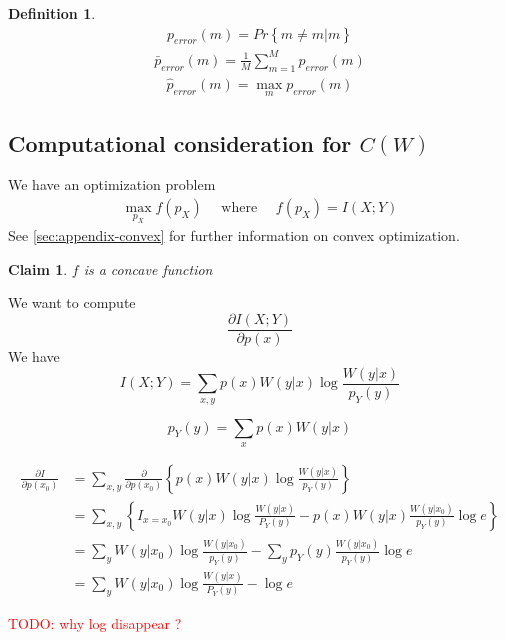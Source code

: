 \documentclass{article}
\newtheorem{claim}{Claim}[section]
\newtheorem{definition}{Definition}[section]
\theoremstyle{definition} %
\newcommand{\todo}[1]{\textcolor{red}{TODO: #1}}
\renewcommand{\Pr}[1]{Pr\left\{#1\right\}}
\begin{document}
\begin{definition}
  \begin{align*}
    p_{error}(m) = \Pr{\hat{m} \neq m | m}
  \end{align*}
  \begin{align*}
    \bar{p}_{error}(m) = \frac{1}{M} \sum_{m=1}^M p_{error}(m)
  \end{align*}
  \begin{align*}
    \hat{p}_{error}(m) = \max_{m} p_{error}(m)
  \end{align*}
\end{definition}



\subsection{Computational consideration for $C(W)$}
We have an optimization problem
  \begin{align*}
    \max_{p_X} f(p_X) \quad \text{ where } \quad f(p_X) = I(X ; Y)
  \end{align*}
See \cref{sec:appendix-convex} for further information on convex optimization.
  \begin{claim}
    $f$ is a concave function
  \end{claim}






We want to compute
\[
  \frac {\partial  I(X;Y)} {\partial p (x)}
\]
We have
\[
  I(X;Y) = \sum_{x,y} p(x) W(y|x) \log \frac {W(y|x)} {p_Y(y)}
\]

\[
  p_Y(y) = \sum_x p(x) W(y|x)
\]

\begin{align*}
  \frac {\partial I} {\partial p(x_0)}
  &= \sum_{x,y} \frac \partial {\partial p(x_0)}
  \left\{ p(x) W(y|x) \log \frac {W(y|x)} {p_Y(y)} \right\}\\
  &= \sum_{x,y} \left\{ I_{x=x_0} W(y|x)  \log \frac {W(y|x)} {P_Y(y)} -
    p(x)W(y|x) \frac {W(y|x_0)}{p_Y(y)} \log e \right\}\\
  &= \sum_y W(y|x_0) \log \frac {W(y|x_0)}{p_Y(y)} - \sum_y p_Y(y) \frac {W(y|x_0)}{p_Y(y)} \log e\\
  &= \sum_y W(y|x_0) \log \frac {W(y|x)} {P_Y(y)} - \log e
\end{align*}

\todo{why log disappear ?}
\end{document}

